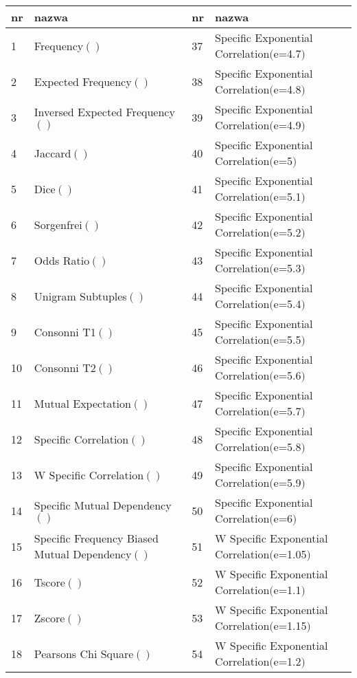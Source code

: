 \begin{table}[h!]
\centering
\footnotesize\setlength{\tabcolsep}{2.5pt}
\begin{tabular}{ l | l || l | l }
	\toprule
	\textbf{nr} 	& \textbf{nazwa}	& \textbf{nr}	& \textbf{nazwa}	\\
	\midrule
	1	&	Frequency$()$									& 37	&	Specific Exponential Correlation$($e=4.7$)$		\\
	2	&	Expected Frequency$()$							& 38	&	Specific Exponential Correlation$($e=4.8$)$		\\
	3	&	Inversed Expected Frequency$()$					& 39	&	Specific Exponential Correlation$($e=4.9$)$		\\
	4	&	Jaccard$()$										& 40	&	Specific Exponential Correlation$($e=5$)$		\\
	5	&	Dice$()$										& 41	&	Specific Exponential Correlation$($e=5.1$)$		\\
	6	&	Sorgenfrei$()$									& 42	&	Specific Exponential Correlation$($e=5.2$)$		\\
	7	&	Odds Ratio$()$									& 43	&	Specific Exponential Correlation$($e=5.3$)$		\\
	8	&	Unigram Subtuples$()$							& 44	&	Specific Exponential Correlation$($e=5.4$)$		\\
	9	&	Consonni T1$()$									& 45	&	Specific Exponential Correlation$($e=5.5$)$		\\
	10	&	Consonni T2$()$									& 46	&	Specific Exponential Correlation$($e=5.6$)$		\\
	11	&	Mutual Expectation$()$							& 47	&	Specific Exponential Correlation$($e=5.7$)$		\\
	12	&	Specific Correlation$()$						& 48	&	Specific Exponential Correlation$($e=5.8$)$		\\
	13	&	W Specific Correlation$()$						& 49	&	Specific Exponential Correlation$($e=5.9$)$		\\
	14	&	Specific Mutual Dependency$()$					& 50	&	Specific Exponential Correlation$($e=6$)$		\\
	15	&	Specific Frequency Biased Mutual Dependency$()$	& 51	&	W Specific Exponential Correlation$($e=1.05$)$	\\
	16	&	Tscore$()$										& 52 	& 	W Specific Exponential Correlation$($e=1.1$)$	\\
	17	&	Zscore$()$										& 53 	& 	W Specific Exponential Correlation$($e=1.15$)$	\\
	18	&	Pearsons Chi Square$()$							& 54	&	W Specific Exponential Correlation$($e=1.2$)$	\\

\end{tabular}
\end{table}
